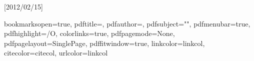 \newcommand{\refname}{{\sffamily References}}
\usepackage{aecompl}


\usepackage[intoc]{nomencl}
\renewcommand{\nomname}{Notations and Acronyms}
\nomlabelwidth=25mm


 \makenomenclature
 \renewcommand{\nomgroup}[1]{%
\ifthenelse{\equal{#1}{N}}{\item[\Large\sffamily\textbf{Notations}]}{%
\ifthenelse{\equal{#1}{X}}{\item[\Large\sffamily\textbf{Acronyms}]}{}}}

\usepackage{makeidx}
 \makeindex


\makenomenclature



\usepackage{ifpdf}

\ifpdf
  \usepackage{graphicx}
  \usepackage[pagebackref,hyperindex=true]{hyperref}
\else
  \usepackage{graphicx}
  \usepackage[dvipdfm,pagebackref,hyperindex=true]{hyperref}
\fi

\usepackage{cleveref}[2012/02/15]%



\graphicspath{{.}{imgs/}}

\renewcommand*{\backref}[1]{}
\renewcommand*{\backrefalt}[4]{%
\ifcase #1 %
(Not cited)%
\or
(Cited on page~#2.)%
\else
(Cited on pages~#2.)%
\fi}
\renewcommand*{\backrefsep}{, }
\renewcommand*{\backreftwosep}{ and~}
\renewcommand*{\backreflastsep}{ and~}

\usepackage{color}


\hypersetup
{
bookmarksopen=true,
pdftitle=\mytitle,
pdfauthor=\myauthor, %
pdfsubject="", %
pdfmenubar=true, %
pdfhighlight=/O, %
colorlinks=true, %
pdfpagemode=None, %
pdfpagelayout=SinglePage, %
pdffitwindow=true, %
linkcolor=linkcol, %
citecolor=citecol, %
urlcolor=linkcol %
}

